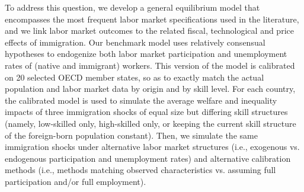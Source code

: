 \documentclass[a4paper,12pt]{article}
\begin{document}
To address this question, we develop a general equilibrium model that encompasses the most frequent labor market specifications used in the literature, and we link labor market outcomes to the related fiscal, technological and price effects of immigration. Our benchmark model uses relatively consensual hypotheses to endogenize both labor market participation and unemployment rates of (native and immigrant) workers. This version of the model is calibrated on 20 selected OECD member states, so as to exactly match the actual population and labor market data by origin and by skill level. For each country, the calibrated model is used to simulate the average welfare and inequality impacts of three immigration shocks of equal size but differing skill structures (namely, low-skilled only, high-skilled only, or keeping the current skill structure of the foreign-born population constant). Then, we simulate the same immigration shocks under alternative labor market structures (i.e., exogenous vs. endogenous participation and unemployment rates) and alternative calibration methods (i.e., methods matching observed characteristics vs. assuming full participation and/or full employment).
\end{document}
